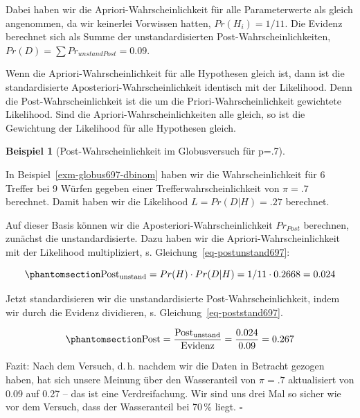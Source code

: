 \documentclass[
  ngerman,
  letterpaper,
  twoside,
  open=any]{scrbook}
\theoremstyle{definition}
\newtheorem{example}{Beispiel}[chapter]
\theoremstyle{plain}
\theoremstyle{definition}
\theoremstyle{definition}
\theoremstyle{definition}
\newtheorem{example}{Beispiel}[chapter]
\theoremstyle{definition}
\theoremstyle{remark}
\begin{document}
Dabei haben wir die Apriori-Wahrscheinlichkeit für alle Parameterwerte
als gleich angenommen, da wir keinerlei Vorwissen hatten,
\(Pr(H_i) = 1/11\). Die Evidenz berechnet sich als Summe der
unstandardisierten Post-Wahrscheinlichkeiten,
\(Pr(D) = \sum Pr_{unstandPost}=0.09\).

Wenn die Apriori-Wahrscheinlichkeit für alle Hypothesen gleich ist, dann
ist die standardisierte Aposteriori-Wahrscheinlichkeit identisch mit der
Likelihood. Denn die Post-Wahrscheinlichkeit ist die um die
Priori-Wahrscheinlichkeit gewichtete Likelihood. Sind die
Apriori-Wahrscheinlichkeiten alle gleich, so ist die Gewichtung der
Likelihood für alle Hypothesen gleich.

\begin{example}[Post-Wahrscheinlichkeit im Globusversuch für
p=.7]\protect\hypertarget{exm-globus697-post}{}\label{exm-globus697-post}

In Beispiel~\ref{exm-globus697-dbinom} haben wir die Wahrscheinlichkeit
für 6 Treffer bei 9 Würfen gegeben einer Trefferwahrscheinlichkeit von
\(\pi = .7\) berechnet. Damit haben wir die Likelihood
\(L = Pr(D|H) =.27\) berechnet.

Auf dieser Basis können wir die Aposteriori-Wahrscheinlichkeit
\(Pr_{Post}\) berechnen, zunächst die unstandardisierte. Dazu haben wir
die Apriori-Wahrscheinlichkeit mit der Likelihood multipliziert, s.
Gleichung~\ref{eq-postunstand697}:

\begin{equation}\protect\phantomsection\label{eq-postunstand697}{
\text{Post}_{\text{unstand}} = Pr(H) \cdot Pr(D|H) = 1/11 \cdot 0.2668 = 0.024
}\end{equation}

Jetzt standardisieren wir die unstandardisierte Post-Wahrscheinlichkeit,
indem wir durch die Evidenz dividieren, s.
Gleichung~\ref{eq-poststand697}.

\begin{equation}\protect\phantomsection\label{eq-poststand697}{\text{Post} = \frac{\text{Post}_{\text{unstand}}}{\text{Evidenz}} = \frac{0.024}{0.09} = 0.267}\end{equation}

Fazit: Nach dem Versuch, d.\,h. nachdem wir die Daten in Betracht
gezogen haben, hat sich unsere Meinung über den Wasseranteil von
\(\pi=.7\) aktualisiert von 0.09 auf 0.27 -- das ist eine
Verdreifachung. Wir sind uns drei Mal so sicher wie vor dem Versuch,
dass der Wasseranteil bei 70\,\% liegt. \(\square\)

\end{example}
\end{document}

